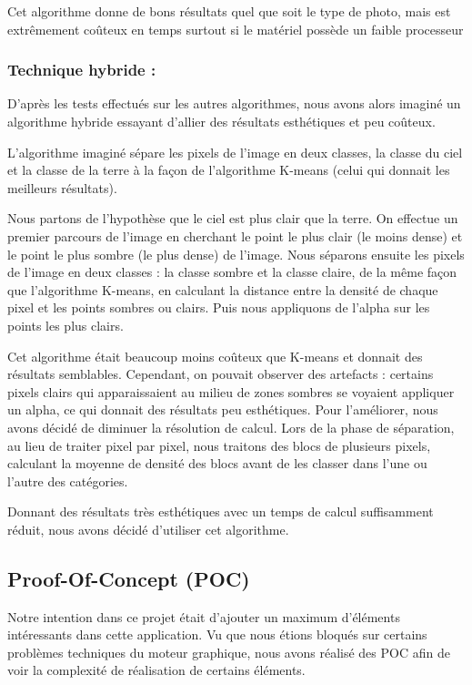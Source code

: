 \documentclass{report}
\begin{document}
Cet algorithme donne de bons résultats quel que soit le type de photo,
mais est extrêmement coûteux en temps surtout si le matériel possède un
faible processeur

\subsubsection{Technique hybride :}

D’après les tests effectués sur les autres algorithmes, nous avons alors
imaginé un algorithme hybride essayant d’allier des résultats esthétiques
et peu coûteux.
\bigskip

L’algorithme imaginé sépare les pixels de l’image en deux classes, la
classe du ciel et la classe de la terre à la façon de l’algorithme
K-means (celui qui donnait les meilleurs résultats).

Nous partons de
l’hypothèse que le ciel est plus clair que la terre. On effectue un
premier parcours de l’image en cherchant le point le plus clair (le
moins dense) et le point le plus sombre (le plus dense) de l’image. Nous
séparons ensuite les pixels de l’image en deux classes : la classe
sombre et la classe claire, de la même façon que l’algorithme K-means,
en calculant la distance entre la densité de chaque pixel et les points
sombres ou clairs. Puis nous appliquons de l’alpha sur les points les plus clairs.
\bigskip

Cet algorithme était beaucoup moins coûteux que K-means et donnait des
résultats semblables. Cependant, on pouvait observer des
artefacts : certains pixels clairs qui
apparaissaient au milieu de zones sombres se voyaient appliquer un
alpha, ce qui donnait des résultats peu esthétiques. Pour l’améliorer,
nous avons décidé de diminuer la résolution de calcul. Lors de la phase
de séparation, au lieu de traiter pixel par pixel, nous traitons des
blocs de plusieurs pixels, calculant la moyenne de densité des blocs
avant de les classer dans l’une ou l’autre des catégories.
\bigskip

Donnant des résultats très esthétiques avec un temps de calcul suffisamment 
réduit, nous avons décidé d'utiliser cet algorithme.

\subsection{Proof-Of-Concept (POC)}
\bigskip


Notre intention dans ce projet était d’ajouter un maximum d'éléments
intéressants dans cette application. Vu que nous étions bloqués sur
certains problèmes techniques du moteur graphique, nous avons réalisé
des POC afin de voir la complexité de réalisation de certains éléments.
\end{document}
